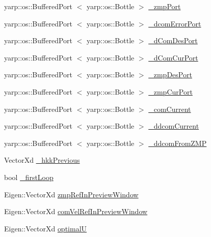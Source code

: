\begin{DoxyCompactItemize}
\item 
yarp\-::os\-::\-Buffered\-Port\*
$<$ yarp\-::os\-::\-Bottle $>$ \hyperlink{classWalkingClient_af2e0817fa94ca802775addd22b09bf7a}{\-\_\-zmp\-Port}
\item 
yarp\-::os\-::\-Buffered\-Port\*
$<$ yarp\-::os\-::\-Bottle $>$ \hyperlink{classWalkingClient_a1b01264c9d9d403a68a149d86d1bc53f}{\-\_\-dcom\-Error\-Port}
\item 
yarp\-::os\-::\-Buffered\-Port\*
$<$ yarp\-::os\-::\-Bottle $>$ \hyperlink{classWalkingClient_a17369473b4fe2ff0eaecc7d41a8430c7}{\-\_\-d\-Com\-Des\-Port}
\item 
yarp\-::os\-::\-Buffered\-Port\*
$<$ yarp\-::os\-::\-Bottle $>$ \hyperlink{classWalkingClient_a1fbc9d7f1e967f24acda745028f865df}{\-\_\-d\-Com\-Cur\-Port}
\item 
yarp\-::os\-::\-Buffered\-Port\*
$<$ yarp\-::os\-::\-Bottle $>$ \hyperlink{classWalkingClient_acbac3e142471448b50dd605e4217b0d0}{\-\_\-zmp\-Des\-Port}
\item 
yarp\-::os\-::\-Buffered\-Port\*
$<$ yarp\-::os\-::\-Bottle $>$ \hyperlink{classWalkingClient_a546e6830e43d19ba7d8a8e808e28ef53}{\-\_\-zmp\-Cur\-Port}
\item 
yarp\-::os\-::\-Buffered\-Port\*
$<$ yarp\-::os\-::\-Bottle $>$ \hyperlink{classWalkingClient_a199a104e0d4d52deae07d88d8229b60d}{\-\_\-com\-Current}
\item 
yarp\-::os\-::\-Buffered\-Port\*
$<$ yarp\-::os\-::\-Bottle $>$ \hyperlink{classWalkingClient_a692d95b3e76a396d107b0c29a3d591f1}{\-\_\-ddcom\-Current}
\item 
yarp\-::os\-::\-Buffered\-Port\*
$<$ yarp\-::os\-::\-Bottle $>$ \hyperlink{classWalkingClient_a41b7320607812418af496b8b2c30204f}{\-\_\-ddcom\-From\-Z\-M\-P}
\item 
\-Vector\-Xd \hyperlink{classWalkingClient_abc3c504305c00a27e9fd38a8bf08ecda}{\-\_\-hkk\-Previous}
\item 
bool \hyperlink{classWalkingClient_ab645ecb2d55e28b57a64ca48ee638b1e}{\-\_\-first\-Loop}
\item 
\-Eigen\-::\-Vector\-Xd \hyperlink{classWalkingClient_af28b3cd3b1202f83e193b098572fbdd3}{zmp\-Ref\-In\-Preview\-Window}
\item 
\-Eigen\-::\-Vector\-Xd \hyperlink{classWalkingClient_ab3b1defedb6d79b5b6eaadd52bbad9f5}{com\-Vel\-Ref\-In\-Preview\-Window}
\item 
\-Eigen\-::\-Vector\-Xd \hyperlink{classWalkingClient_a0e5aee88e377029d79f57e778c583f18}{optimal\-U}
\end{DoxyCompactItemize}


